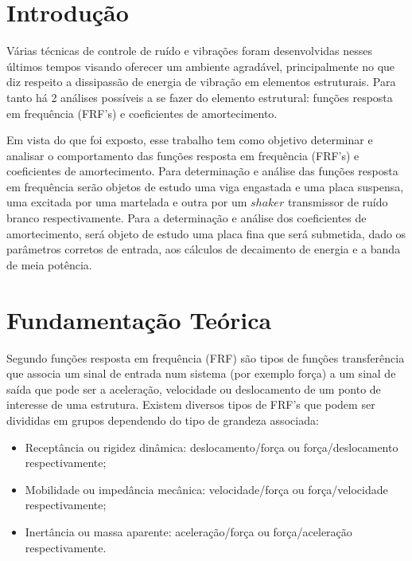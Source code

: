 \chapter{Introdução}\label{introducao}

Várias técnicas de controle de ruído e vibrações foram desenvolvidas nesses últimos tempos visando oferecer um ambiente agradável, principalmente no que diz respeito a dissipassão de energia de vibração em elementos estruturais. Para tanto há 2 análises possíveis a se fazer do elemento estrutural: funções resposta em frequência (FRF's) e coeficientes de amortecimento. 

Em vista do que foi exposto, esse trabalho tem como objetivo determinar e analisar o comportamento das funções resposta em frequência (FRF's) e coeficientes de amortecimento. Para determinação e análise das funções resposta em frequência serão objetos de estudo uma viga engastada e uma placa suspensa, uma excitada por uma martelada e outra por um $shaker$ transmissor de ruído branco respectivamente. Para a determinação e análise dos coeficientes de amortecimento, será objeto de estudo uma placa fina que será submetida, dado os parâmetros corretos de entrada, aos cálculos de decaimento de energia e a banda de meia potência.

\chapter{Fundamentação Teórica}\label{fundamentacao}

Segundo \cite{lenzi2009modelos} funções resposta em frequência (FRF) são tipos de funções transferência que associa um sinal de entrada num sistema (por exemplo força) a um sinal de saída que pode ser a aceleração, velocidade ou deslocamento de um ponto de interesse de uma estrutura. Existem diversos tipos de FRF's que podem ser divididas em grupos dependendo do tipo de grandeza associada:
\begin{itemize}
	\item Receptância ou rigidez dinâmica: deslocamento/força ou força/deslocamento respectivamente;
	\item Mobilidade ou impedância mecânica: velocidade/força ou força/velocidade respectivamente;
	\item Inertância ou massa aparente: aceleração/força ou força/aceleração respectivamente.
\end{itemize}

